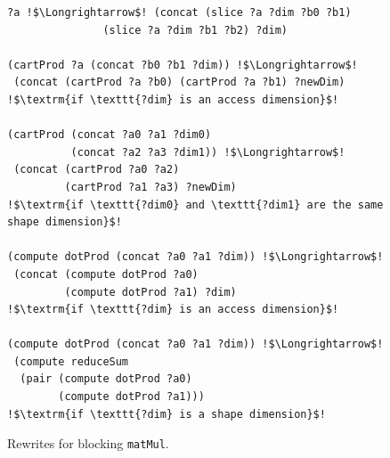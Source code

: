 \documentclass[prologue, dvipsnames, sigplan, screen, review, anonymous]{acmart}
\newcommand{\tcd}[1]{\texttt{#1}}
\begin{document}
\begin{figure}
\begin{lstlisting}[escapechar=!]
?a !$\Longrightarrow$! (concat (slice ?a ?dim ?b0 ?b1)
               (slice ?a ?dim ?b1 ?b2) ?dim)
               
(cartProd ?a (concat ?b0 ?b1 ?dim)) !$\Longrightarrow$!
 (concat (cartProd ?a ?b0) (cartProd ?a ?b1) ?newDim)
!$\textrm{if \texttt{?dim} is an access dimension}$!
 
(cartProd (concat ?a0 ?a1 ?dim0) 
          (concat ?a2 ?a3 ?dim1)) !$\Longrightarrow$!
 (concat (cartProd ?a0 ?a2) 
         (cartProd ?a1 ?a3) ?newDim)
!$\textrm{if \texttt{?dim0} and \texttt{?dim1} are the same shape dimension}$!

(compute dotProd (concat ?a0 ?a1 ?dim)) !$\Longrightarrow$!
 (concat (compute dotProd ?a0)
         (compute dotProd ?a1) ?dim)
!$\textrm{if \texttt{?dim} is an access dimension}$!

(compute dotProd (concat ?a0 ?a1 ?dim)) !$\Longrightarrow$!
 (compute reduceSum
  (pair (compute dotProd ?a0)
        (compute dotProd ?a1)))
!$\textrm{if \texttt{?dim} is a shape dimension}$!
\end{lstlisting}
\justify
\vspace{-1em}
\caption{
Rewrites for blocking \tcd{matMul}.
}
\label{fig:all-blocking-rewrites}
\end{figure}
\end{document}
